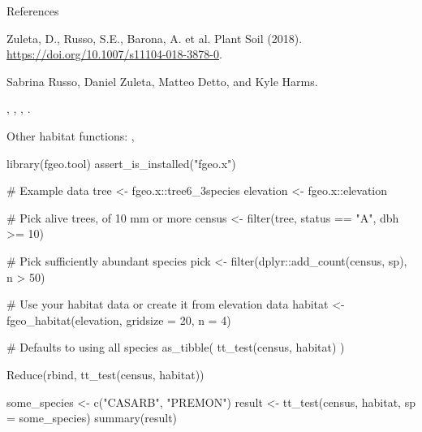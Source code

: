 \documentclass[a4paper]{book}
\begin{document}
%
\begin{Section}{References}

Zuleta, D., Russo, S.E., Barona, A. et al. Plant Soil (2018).
\url{https://doi.org/10.1007/s11104-018-3878-0}.
\end{Section}
%
\begin{Author}\relax
Sabrina Russo, Daniel Zuleta, Matteo Detto, and Kyle Harms.
\end{Author}
%
\begin{SeeAlso}\relax
{}, , ,
.

Other habitat functions: ,
\end{SeeAlso}
%
\begin{Examples}
\begin{ExampleCode}
library(fgeo.tool)
assert_is_installed("fgeo.x")

# Example data
tree <- fgeo.x::tree6_3species
elevation <- fgeo.x::elevation

# Pick alive trees, of 10 mm or more
census <- filter(tree, status == "A", dbh >= 10)

# Pick sufficiently abundant species
pick <- filter(dplyr::add_count(census, sp), n > 50)

# Use your habitat data or create it from elevation data
habitat <- fgeo_habitat(elevation, gridsize = 20, n = 4)

# Defaults to using all species
as_tibble(
  tt_test(census, habitat)
)

Reduce(rbind, tt_test(census, habitat))

some_species <- c("CASARB", "PREMON")
result <- tt_test(census, habitat, sp = some_species)
summary(result)
\end{ExampleCode}
\end{Examples}
\printindex{}
\end{document}
